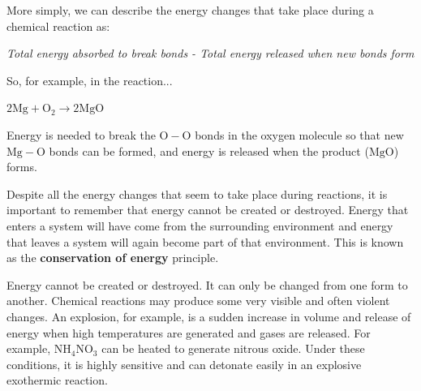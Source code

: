       \label{m38711*id64360}More simply, we can describe the energy changes that take place during a chemical reaction as:\par 
      \label{m38711*id64364}
        \textsl{Total energy absorbed to break bonds - Total energy released when new bonds form}
      \par 
      \label{m38711*id64371}So, for example, in the reaction...\par 
      \label{m38711*id64375}$2\mathrm{Mg}+{\mathrm{O}}_{2}\to 
            2\mathrm{MgO}$
      \par 
      \label{m38711*id64411}Energy is needed to break the $\mathrm{O}-\mathrm{O}$ bonds in the oxygen molecule so that new $\mathrm{Mg}-\mathrm{O}$ bonds can be formed, and energy is released when the product ($\mathrm{MgO}$) forms.\par 
      \label{m38711*id64416}Despite all the energy changes that seem to take place during reactions, it is important to remember that energy cannot be created or destroyed. Energy that enters a system will have come from the surrounding environment and energy that leaves a system will again become part of that environment. This is known as the \textbf{conservation of energy} principle.\par 
\label{m38711*fhsst!!!underscore!!!id409}
 { \label{m38711*meaningfhsst!!!underscore!!!id409}
      Energy cannot be created or destroyed. It can only be changed from one form to another. 
       } 
      \label{m38711*id64445}Chemical reactions may produce some very visible and often violent changes. An explosion, for example, is a sudden increase in volume and release of energy when high temperatures are generated and gases are released. For example, $\mathrm{NH}{}_{4}{\mathrm{NO}}_{3}$ can be heated to generate nitrous oxide. Under these conditions, it is highly sensitive and can detonate easily in an explosive exothermic reaction.\par 
    \label{m38711*cid5}
